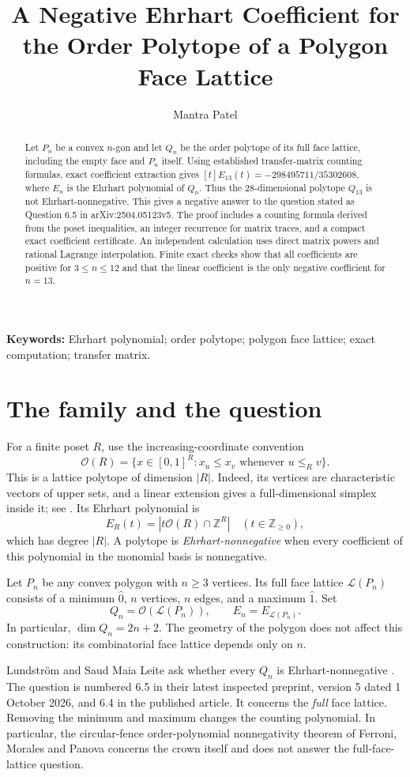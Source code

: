 \documentclass[11pt,letterpaper]{article}
\title{A Negative Ehrhart Coefficient for the Order Polytope of a Polygon Face Lattice}
\author{Mantra Patel}
\date{}
\newcommand{\OO}{\mathcal O}
\newcommand{\LL}{\mathcal L}
\begin{document}
\maketitle
\begin{abstract}
Let $P_n$ be a convex $n$-gon and let $Q_n$ be the order polytope of its full face lattice, including the empty face and $P_n$ itself. Using established transfer-matrix counting formulas, exact coefficient extraction gives
$[t]E_{13}(t)=-298495711/35302608$, where $E_n$ is the Ehrhart polynomial of $Q_n$. Thus the 28-dimensional polytope $Q_{13}$ is not Ehrhart-nonnegative. This gives a negative answer to the question stated as Question 6.5 in arXiv:2504.05123v5. The proof includes a counting formula derived from the poset inequalities, an integer recurrence for matrix traces, and a compact exact coefficient certificate. An independent calculation uses direct matrix powers and rational Lagrange interpolation. Finite exact checks show that all coefficients are positive for $3\leq n\leq12$ and that the linear coefficient is the only negative coefficient for $n=13$.
\end{abstract}
\noindent\textbf{Keywords:} Ehrhart polynomial; order polytope; polygon face lattice; exact computation; transfer matrix.


\section{The family and the question}
For a finite poset $R$, use the increasing-coordinate convention
\[
 \OO(R)=\{x\in[0,1]^R:x_u\leq x_v\text{ whenever }u\leq_Rv\}.
\]
This is a lattice polytope of dimension $|R|$. Indeed, its vertices are characteristic vectors of upper sets, and a linear extension gives a full-dimensional simplex inside it; see \cite{Stanley}. Its Ehrhart polynomial is
\[
 E_R(t)=|t\OO(R)\cap\mathbb Z^R|\quad(t\in\mathbb Z_{\geq0}),
\]
which has degree $|R|$. A polytope is \emph{Ehrhart-nonnegative} when every coefficient of this polynomial in the monomial basis is nonnegative.

Let $P_n$ be any convex polygon with $n\geq3$ vertices. Its full face lattice $\LL(P_n)$ consists of a minimum $\hat0$, $n$ vertices, $n$ edges, and a maximum $\hat1$. Set
\[
 Q_n=\OO(\LL(P_n)),\qquad E_n=E_{\LL(P_n)}.
\]
In particular, $\dim Q_n=2n+2$. The geometry of the polygon does not affect this construction: its combinatorial face lattice depends only on $n$.

Lundstr\"om and Saud Maia Leite ask whether every $Q_n$ is Ehrhart-nonnegative \cite{LSML}. The question is numbered 6.5 in their latest inspected preprint, version 5 dated 1 October 2026, and 6.4 in the published article. It concerns the \emph{full} face lattice. Removing the minimum and maximum changes the counting polynomial. In particular, the circular-fence order-polynomial nonnegativity theorem of Ferroni, Morales and Panova \cite[arXiv v3, Theorem~7.7]{FMP} concerns the crown itself and does not answer the full-face-lattice question.
\end{document}

